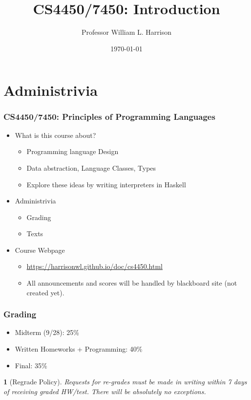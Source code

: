 \documentclass{beamer}
\title{CS4450/7450: Introduction}
\author{Professor William L. Harrison}
\date{\today}
\newtheorem{remark}{}
\begin{document}
\section{Administrivia}

\frame{\titlepage}


\frame
{
    \frametitle{CS4450/7450: Principles of Programming Languages}
    
\begin{itemize}
\item What is this course about?
\begin{itemize}
\item Programming language Design
\pause
\item Data abstraction, Language Classes, Types
\item Explore these ideas by writing interpreters in Haskell
\end{itemize}
\pause

\item Administrivia
\begin{itemize}
\item Grading
\item Texts
\end{itemize}
\pause

\item Course Webpage
\begin{itemize}
\item \url{https://harrisonwl.github.io/doc/cs4450.html}
\item All announcements and scores will be handled by blackboard site (not created yet).
\end{itemize}

\end{itemize}
}

\frame
{
    \frametitle{Grading}
    
\begin{itemize}
\item Midterm (9/28): 25\%

\item Written Homeworks + Programming: 40\%

\item Final: 35\%

\end{itemize}

\begin{remark}[Regrade Policy]
Requests for re-grades must be made in writing within 7 days of 
receiving graded HW/test. There will be absolutely no exceptions.
\end{remark}
}
\end{document}
